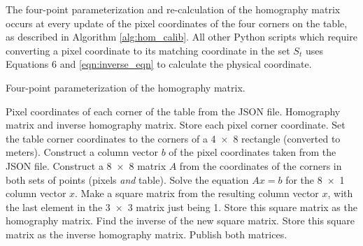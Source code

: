 \documentclass{article}
\begin{document}
          The four-point parameterization and re-calculation of the homography matrix occurs at every update of the pixel coordinates of the four corners on the table, as described in Algorithm \ref{alg:hom_calib}. All other Python scripts which require converting a pixel coordinate to its matching coordinate in the set $S_t$ uses Equations 6 and \ref{eqn:inverse_eqn} to calculate the physical coordinate.
          \begin{algorithm}[H]
               \caption[Homography Calibrater]{Four-point parameterization of the homography matrix.}
               \label{alg:hom_calib}
               \begin{algorithmic}[1]
                    \REQUIRE Pixel coordinates of each corner of the table from the JSON file.
                    \ENSURE Homography matrix and inverse homography matrix.
                    \STATE Store each pixel corner coordinate.
                    \STATE Set the table corner coordinates to the corners of a \SI{4x8}{\ft} rectangle (converted to meters).
                    \STATE Construct a column vector $b$ of the pixel coordinates taken from the JSON file.
                    \STATE Construct a \num{8x8} matrix $A$ from the coordinates of the corners in both sets of points (pixels \textit{and} table).
                    \STATE Solve the equation $Ax=b$ for the \num{8x1} column vector $x$.
                    \STATE Make a square matrix from the resulting column vector $x$, with the last element in the \num{3x3} matrix just being 1.
                    \STATE Store this square matrix as the homography matrix.
                    \STATE Find the inverse of the new square matrix.
                    \STATE Store this square matrix as the inverse homography matrix.
                    \STATE Publish both matrices.
                    \ENDFOR
               \end{algorithmic}
          \end{algorithm}
\end{document}
